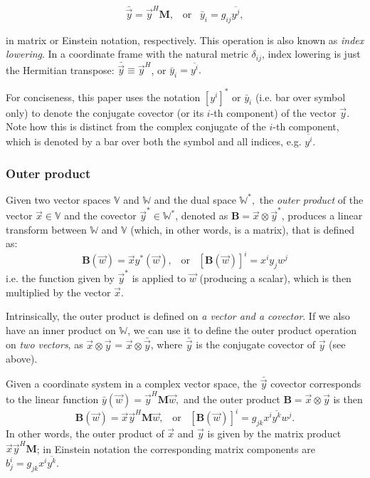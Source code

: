 \documentclass{aa}
\newcommand{\herm}{H}
\begin{document}
\[
\bar{\vec y} = \vec y^H \mathbf{M},\;\;\;\mbox{or}\;\;\;\bar y_i=g_{ij} \overline{y^j},
\]

in matrix or Einstein notation, respectively. This operation is also known as \emph{index lowering}.
In a coordinate frame with the natural metric $\delta_{ij}$, index lowering is just the Hermitian transpose: $\bar{\vec y}\equiv\vec y^H$, or $\bar y_i=\overline{y^i}.$

For conciseness, this paper uses the notation $[y^i]^*$ or $\bar y_i$ (i.e. bar over symbol only) to denote the conjugate covector (or its $i$-th component) of the vector $\vec y$. Note how this is distinct from the complex conjugate of the $i$-th component, which is denoted by a bar over both the symbol and all indices, e.g. $\overline{y^i}.$

\subsubsection{Outer product}
\label{sec:outer-prod}

Given two vector spaces $\mathbb{V}$ and $\mathbb{W}$ and the dual space $\mathbb{W}^*,$ the \emph{outer product} of the vector 
$\vec x \in \mathbb{V}$ and the covector $\vec y^* \in \mathbb{W}^*$, denoted as $\mathbf{B}=\vec x\otimes\vec y^*$,  produces a linear transform between $\mathbb{W}$ and $\mathbb{V}$ (which, in other words, is a matrix), that is defined as:
\[
\mathbf{B}(\vec w) = \vec x y^*(\vec w),\;\;\;\mbox{or}\;\;\;[\mathbf{B}(\vec w)]^i = x^iy_jw^j
\]
i.e. the function given by $\vec y^*$ is applied to $\vec w$ (producing a scalar), which is then multiplied by the vector $\vec x$. 

Intrinsically, the outer product is defined on \emph{a vector and a covector}. If we also have an inner product on $\mathbb{W}$, we can use it to define the outer product operation on \emph{two vectors}, as $\vec x\otimes \vec y$ = $\vec x\otimes \bar{\vec y}$, where $\bar{\vec y}$ is the conjugate covector of $\vec y$ (see above).

Given a coordinate system in a complex vector space, the $\bar{\vec y}$ covector corresponds to the linear function $\bar{y}(\vec w) = \vec y^\herm \mathbf{M} \vec w,$ and the outer product $\mathbf{B}=\vec x\otimes \vec y$ is then
\[
\mathbf{B}(\vec w) = \vec x \vec y^\herm \mathbf{M} \vec w, \;\;\;\mbox{or}\;\;\;[\mathbf{B}(\vec w)]^i = g_{jk} x^i \overline{y^k} w^j.
\]
In other words, the outer product of $\vec x$ and $\vec y$ is given by the matrix product $\vec x \vec y^\herm \mathbf{M}$; in Einstein notation the corresponding matrix components are $b^i_j = g_{jk} x^i \overline{y^k}.$ 
\end{document}
